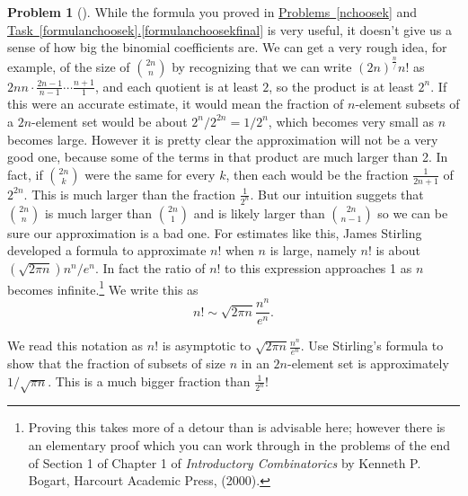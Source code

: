 \documentclass[10pt,]{book}
\theoremstyle{plain}
\theoremstyle{definition}
\newtheorem{activity}[project]{Problem}
\theoremstyle{definition}
\numberwithin{equation}{chapter}
\begin{document}
\begin{activity}[]\label{Stirling_sapproximation}
While the formula you proved in \hyperref[nchoosek]{Problems~\ref{nchoosek}} and \hyperref[formulanchoosekfinal]{Task~\ref{formulanchoosek}.\ref{formulanchoosekfinal}} is very useful, it doesn't give us a sense of how big the binomial coefficients are. We can get a very rough idea, for example, of the size of \(\binom{2n}{n}\) by recognizing that we can write \((2n)^\frac{\underline{n}}/n!\) as \({2n}{n}\cdot
\frac{2n-1}{n-1}\cdots \frac{n+1}{1}\), and each quotient is at least \(2\), so the product is at least \(2^n\). If this were an accurate estimate, it would mean the fraction of \(n\)-element subsets of a \(2n\)-element set would be about \(2^n/2^{2n}=1/2^n\), which becomes very small as \(n\) becomes large. However it is pretty clear the approximation will not be a very good one, because some of the terms in that product are much larger than 2. In fact, if \(\binom{2n}{k}\) were the same for every \(k\), then each would be the fraction \(\frac{1}{2n+1}\) of \(2^{2n}\). This is much larger than the fraction \(\frac{1}{2^n}\). But our intuition suggets that \(\binom{2n}{n}\) is much larger than \(\binom{2n}{1}\) and is likely larger than \(\binom{2n}{n-1}\) so we can be sure our approximation is a bad one. For estimates like this, James Stirling developed a formula to approximate \(n!\) when \(n\) is large, namely \(n!\) is about \(\left(\sqrt{2\pi
n}\right){n^n/ e^n}\). In fact the ratio of \(n!\) to this expression approaches 1 as \(n\) becomes infinite.\footnote{Proving this takes more of a detour than is advisable here; however there is an elementary proof which you can work through in the problems of the end of Section 1 of Chapter 1 of \emph{Introductory Combinatorics} by Kenneth P. Bogart, Harcourt Academic Press, (2000).\label{fn-2}} We write this as%
\begin{equation*}
n!\sim \sqrt{2\pi
n}\frac{n^n}{e^n}.
\end{equation*}
%
\par
We read this notation as \(n!\) is asymptotic to \(\sqrt{2\pi n}\frac{n^n}{e^n}\). Use Stirling's formula to show that the fraction of subsets of size \(n\) in an \(2n\)-element set is approximately \(1/\sqrt{\pi n}\). This is a much bigger fraction than \(\frac{1}{2^n}\)!%
\end{activity}
\typeout{************************************************}
\typeout{************************************************}
\end{document}
